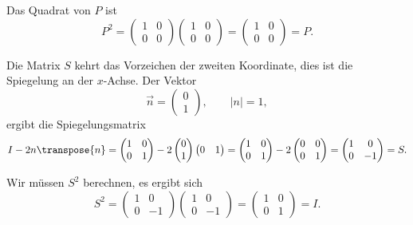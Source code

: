 \begin{loesung}
\begin{teilaufgaben}
\item 
Das Quadrat von $P$ ist
\[
P^2=
\begin{pmatrix}1&0\\0&0\end{pmatrix}
\begin{pmatrix}1&0\\0&0\end{pmatrix}
=
\begin{pmatrix}1&0\\0&0\end{pmatrix}
=
P.
\]
\item
Die Matrix $S$ kehrt das Vorzeichen der zweiten Koordinate, dies ist
die Spiegelung an der $x$-Achse. 
Der Vektor
\[
\vec{n}
=
\begin{pmatrix}0\\1\end{pmatrix},
\qquad
|n| = 1,
\]
ergibt die Spiegelungsmatrix
\[
I-2n\transpose{n}
=
\begin{pmatrix}1&0\\0&1\end{pmatrix}
-2\begin{pmatrix}0\\1\end{pmatrix}\begin{pmatrix}0&1\end{pmatrix}
=
\begin{pmatrix}1&0\\0&1\end{pmatrix}
-2
\begin{pmatrix}0&0\\0&1\end{pmatrix}
=
\begin{pmatrix}1&0\\0&-1\end{pmatrix}
=
S.
\]
\item
Wir müssen $S^2$ berechnen, es ergibt sich
\[
S^2
=
\begin{pmatrix}1&0\\0&-1\end{pmatrix}
\begin{pmatrix}1&0\\0&-1\end{pmatrix}
=
\begin{pmatrix}1&0\\0&1\end{pmatrix}
=
I.
\]
\item 

\end{teilaufgaben}
\end{loesung}
